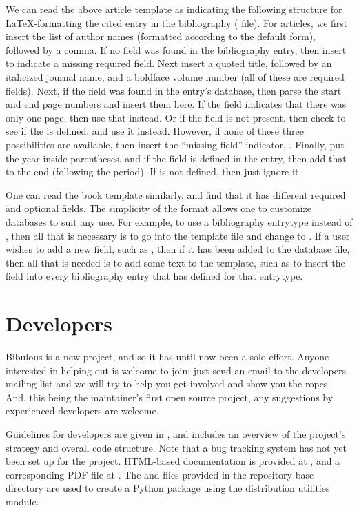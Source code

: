 \documentclass[letterpaper,10pt,english]{sphinxmanual}
\begin{document}
We can read the above article template as indicating the following structure for LaTeX-formatting the cited entry in the bibliography ( file). For articles, we first insert the list of author names (formatted according to the default form), followed by a comma. If no  field was found in the bibliography entry, then insert  to indicate a missing required field. Next insert a quoted title, followed by an italicized journal name, and a boldface volume number (all of these are required fields). Next, if the  field was found in the entry's database, then parse the start and end page numbers and insert them here. If the  field indicates that there was only one page, then use that instead. Or if the  field is not present, then check to see if the  is defined, and use it instead. However, if none of these three possibilities are available, then insert the “missing field” indicator, . Finally, put the year inside parentheses, and if the  field is defined in the entry, then add that to the end (following the period). If  is not defined, then just ignore it.

One can read the book template similarly, and find that it has different required and optional fields. The simplicity of the format allows one to customize databases to suit any use. For example, to use a bibliography entrytype  instead of , then all that is necessary is to go into the template file and change  to . If a user wishes to add a new field, such as , then if it has been added to the  database file, then all that is needed is to add some text to the template, such as  to insert the field into every bibliography entry that has  defined for that entrytype.


\section{Developers}
\label{index:developers}
Bibulous is a new project, and so it has until now been a solo effort. Anyone interested in helping out is welcome to join; just send an email to the developers mailing list and we will try to help you get involved and show you the ropes. And, this being the maintainer's first open source project, any suggestions by experienced developers are welcome.

Guidelines for developers are given in , and includes an overview of the project's strategy and overall code structure. Note that a bug tracking system has not yet been set up for the project. HTML-based documentation is provided at , and a corresponding PDF file at . The  and  files provided in the repository base directory are used to create a Python package using the  distribution utilities module.
\end{document}
